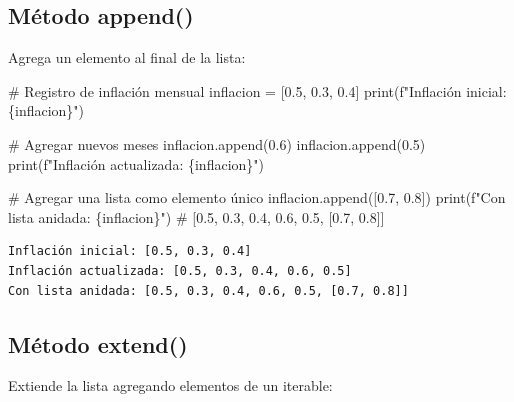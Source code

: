 \documentclass[
  doc,
  floatsintext,
  longtable,
  a4paper,
  nolmodern,
  notxfonts,
  notimes,
  12pt,
  colorlinks=true,linkcolor=blue,citecolor=blue,urlcolor=blue]{apa7}
\newenvironment{Shaded}{\begin{snugshade}}{\end{snugshade}}
\newcommand{\BuiltInTok}[1]{\textcolor[rgb]{0.00,0.23,0.31}{#1}}
\newcommand{\CommentTok}[1]{\textcolor[rgb]{0.37,0.37,0.37}{#1}}
\newcommand{\FloatTok}[1]{\textcolor[rgb]{0.68,0.00,0.00}{#1}}
\newcommand{\NormalTok}[1]{\textcolor[rgb]{0.00,0.23,0.31}{#1}}
\newcommand{\OperatorTok}[1]{\textcolor[rgb]{0.37,0.37,0.37}{#1}}
\newcommand{\SpecialCharTok}[1]{\textcolor[rgb]{0.37,0.37,0.37}{#1}}
\newcommand{\SpecialStringTok}[1]{\textcolor[rgb]{0.13,0.47,0.30}{#1}}
\begin{document}
\subsection{Método append()}\label{muxe9todo-append}

Agrega un elemento al final de la lista:

\begin{Shaded}
\begin{Highlighting}[]
\CommentTok{\# Registro de inflación mensual}
\NormalTok{inflacion }\OperatorTok{=}\NormalTok{ [}\FloatTok{0.5}\NormalTok{, }\FloatTok{0.3}\NormalTok{, }\FloatTok{0.4}\NormalTok{]}
\BuiltInTok{print}\NormalTok{(}\SpecialStringTok{f"Inflación inicial: }\SpecialCharTok{\{}\NormalTok{inflacion}\SpecialCharTok{\}}\SpecialStringTok{"}\NormalTok{)}

\CommentTok{\# Agregar nuevos meses}
\NormalTok{inflacion.append(}\FloatTok{0.6}\NormalTok{)}
\NormalTok{inflacion.append(}\FloatTok{0.5}\NormalTok{)}
\BuiltInTok{print}\NormalTok{(}\SpecialStringTok{f"Inflación actualizada: }\SpecialCharTok{\{}\NormalTok{inflacion}\SpecialCharTok{\}}\SpecialStringTok{"}\NormalTok{)}

\CommentTok{\# Agregar una lista como elemento único}
\NormalTok{inflacion.append([}\FloatTok{0.7}\NormalTok{, }\FloatTok{0.8}\NormalTok{])}
\BuiltInTok{print}\NormalTok{(}\SpecialStringTok{f"Con lista anidada: }\SpecialCharTok{\{}\NormalTok{inflacion}\SpecialCharTok{\}}\SpecialStringTok{"}\NormalTok{)}
\CommentTok{\# [0.5, 0.3, 0.4, 0.6, 0.5, [0.7, 0.8]]}
\end{Highlighting}
\end{Shaded}

\begin{verbatim}
Inflación inicial: [0.5, 0.3, 0.4]
Inflación actualizada: [0.5, 0.3, 0.4, 0.6, 0.5]
Con lista anidada: [0.5, 0.3, 0.4, 0.6, 0.5, [0.7, 0.8]]
\end{verbatim}

\subsection{Método extend()}\label{muxe9todo-extend}

Extiende la lista agregando elementos de un iterable:
\end{document}
